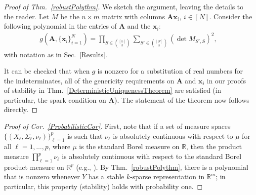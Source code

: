 \documentclass[9pt,twocolumn]{pnas-new}
\begin{document}
\begin{proof}[Proof of Thm.~\ref{robustPolythm}]
We sketch the argument, leaving the details to the reader.
Let $M$ be the $n \times m$ matrix with columns $\mathbf{A}\mathbf{x}_i$, $i \in [N]$.  Consider the following polynomial \cite[Sec.~IV]{Hillar15} in the entries of $\mathbf{A}$ and the $\mathbf{x}_i$:
\begin{align*}
g(\mathbf{A}, \{\mathbf{x}_i\}_{i=1}^N) = \prod_{S \in {[n] \choose k}} \sum_{S' \in {[N] \choose k}} (\det M_{S',S})^2,
\end{align*}
with notation as in Sec.~\ref{Results}.  

It can be checked that when $g$ is nonzero for a substitution of real numbers for the indeterminates, all of the genericity requirements on $\mathbf{A}$ and $\mathbf{x}_i$ in our proofs of stability in Thm.~\ref{DeterministicUniquenessTheorem} are satisfied (in particular, the spark condition on $\mathbf{A}$). The statement of the theorem now follows directly.
\end{proof}

\begin{proof}[Proof of Cor.~\ref{ProbabilisticCor}]
First, note that if a set of measure spaces $\{(X_{\ell}, \Sigma_{\ell}, \nu_{\ell})\}_{\ell=1}^p$ is such that $\nu_{\ell}$ is absolutely continuous with respect to $\mu$ for all $\ell = 1, \ldots, p$, where $\mu$ is the standard Borel measure on $\mathbb{R}$, then the product measure $\prod_{\ell=1}^p \nu_{\ell}$ is absolutely continuous with respect to the standard Borel product measure on $\mathbb{R}^p$ (e.g.,  \cite{folland2013real}). By Thm.~\ref{robustPolythm}, there is a polynomial that is nonzero whenever $Y$ has a stable $k$-sparse representation in $\mathbb R^m$; in particular, this property (stability) holds with probability one.
\end{proof}


%
\end{document}

